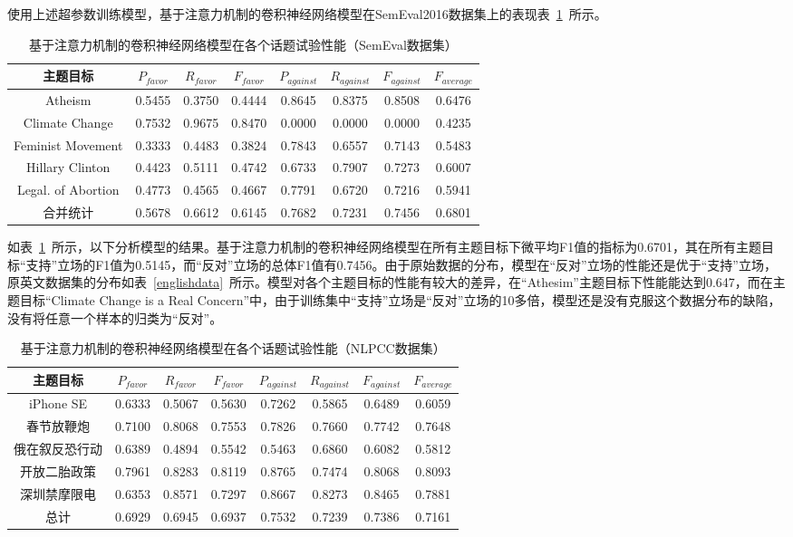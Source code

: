 使用上述超参数训练模型，基于注意力机制的卷积神经网络模型在SemEval2016数据集上的表现表~\ref{a_bi_gru_cnn_semeval}~所示。
\begin{table}[htbp]
	\caption[table123]{基于注意力机制的卷积神经网络模型在各个话题试验性能（SemEval数据集）}
	\label{a_bi_gru_cnn_semeval}
	\vspace{0.5em}\centering\wuhao
	\begin{tabular}{cccccccc}
		\toprule[1.5pt]
		主题目标& $P_{favor}$&$R_{favor}$&$F_{favor}$&$P_{against}$&$R_{against}$&$F_{against}$&$F_{average}$ \\
		\midrule[1pt]
		Atheism&0.5455&0.3750&0.4444&0.8645&0.8375&0.8508&0.6476\\
		Climate Change&0.7532&0.9675&0.8470&0.0000&0.0000&0.0000&0.4235\\
		Feminist Movement&0.3333&0.4483&0.3824&0.7843&0.6557&0.7143&0.5483\\
		Hillary Clinton&0.4423&0.5111&0.4742&0.6733&0.7907&0.7273&0.6007\\
		Legal. of Abortion&0.4773&0.4565&0.4667&0.7791&0.6720&0.7216&0.5941\\
		合并统计&0.5678&0.6612&0.6145&0.7682&0.7231&0.7456&0.6801\\
		\bottomrule[1.5pt]
	\end{tabular}
\end{table}

如表~\ref{a_bi_gru_cnn_semeval}~所示，以下分析模型的结果。基于注意力机制的卷积神经网络模型在所有主题目标下微平均F1值的指标为0.6701，其在所有主题目标“支持”立场的F1值为0.5145，而“反对”立场的总体F1值有0.7456。由于原始数据的分布，模型在“反对”立场的性能还是优于“支持”立场，原英文数据集的分布如表~\ref{englishdata}~所示。模型对各个主题目标的性能有较大的差异，在“Athesim”主题目标下性能能达到0.647，而在主题目标“Climate Change is a Real Concern”中，由于训练集中“支持”立场是“反对”立场的10多倍，模型还是没有克服这个数据分布的缺陷，没有将任意一个样本的归类为“反对”。

\begin{table}[htbp]
	\caption[table123]{基于注意力机制的卷积神经网络模型在各个话题试验性能（NLPCC数据集）}
	\label{chinese_a_bi_gru_cnn_semeval}
	\vspace{0.5em}\centering\wuhao
	\begin{tabular}{cccccccc}
		\toprule[1.5pt]
		主题目标& $P_{favor}$&$R_{favor}$&$F_{favor}$&$P_{against}$&$R_{against}$&$F_{against}$&$F_{average}$ \\
		\midrule[1pt]
		iPhone SE&0.6333&0.5067&0.5630&0.7262&0.5865&0.6489&0.6059\\
		春节放鞭炮&0.7100&0.8068&0.7553&0.7826&0.7660&0.7742&0.7648\\
		俄在叙反恐行动&0.6389&0.4894&0.5542&0.5463&0.6860&0.6082&0.5812\\
		开放二胎政策&0.7961&0.8283&0.8119&0.8765&0.7474&0.8068&0.8093\\
		深圳禁摩限电&0.6353&0.8571&0.7297&0.8667&0.8273&0.8465&0.7881\\
		总计&0.6929&0.6945&0.6937&0.7532&0.7239&0.7386&0.7161\\
		\bottomrule[1.5pt]
	\end{tabular}
\end{table}

